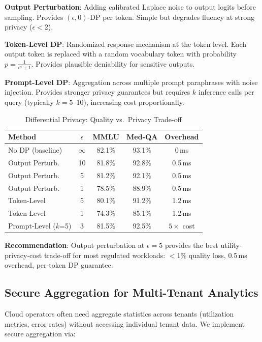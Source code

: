 \documentclass[conference,10pt]{IEEEtran}
\begin{document}
\textbf{Output Perturbation}: Adding calibrated Laplace noise to output logits before sampling. Provides $(\epsilon, 0)$-DP per token. Simple but degrades fluency at strong privacy ($\epsilon < 2$).

\textbf{Token-Level DP}: Randomized response mechanism at the token level. Each output token is replaced with a random vocabulary token with probability $p = \frac{1}{e^\epsilon + 1}$. Provides plausible deniability for sensitive outputs.

\textbf{Prompt-Level DP}: Aggregation across multiple prompt paraphrases with noise injection. Provides stronger privacy guarantees but requires $k$ inference calls per query (typically $k = 5$--10), increasing cost proportionally.

\begin{table}[!htbp]
\caption{Differential Privacy: Quality vs.\ Privacy Trade-off}
\label{tab:dp}
\centering\footnotesize
\begin{tabular}{@{}lcccc@{}}
\toprule
\textbf{Method} & $\epsilon$ & \textbf{MMLU} & \textbf{Med-QA} & \textbf{Overhead} \\
\midrule
No DP (baseline) & $\infty$ & 82.1\% & 93.1\% & 0\,ms \\
Output Perturb. & 10 & 81.8\% & 92.8\% & 0.5\,ms \\
Output Perturb. & 5 & 81.2\% & 92.1\% & 0.5\,ms \\
Output Perturb. & 1 & 78.5\% & 88.9\% & 0.5\,ms \\
Token-Level & 5 & 80.1\% & 91.2\% & 1.2\,ms \\
Token-Level & 1 & 74.3\% & 85.1\% & 1.2\,ms \\
Prompt-Level ($k$=5) & 3 & 81.5\% & 92.5\% & $5\times$ cost \\
\bottomrule
\end{tabular}
\end{table}

\textbf{Recommendation}: Output perturbation at $\epsilon=5$ provides the best utility-privacy-cost trade-off for most regulated workloads: $<$1\% quality loss, 0.5\,ms overhead, per-token DP guarantee.

\subsection{Secure Aggregation for Multi-Tenant Analytics}

Cloud operators often need aggregate statistics across tenants (utilization metrics, error rates) without accessing individual tenant data. We implement secure aggregation via:
\end{document}
